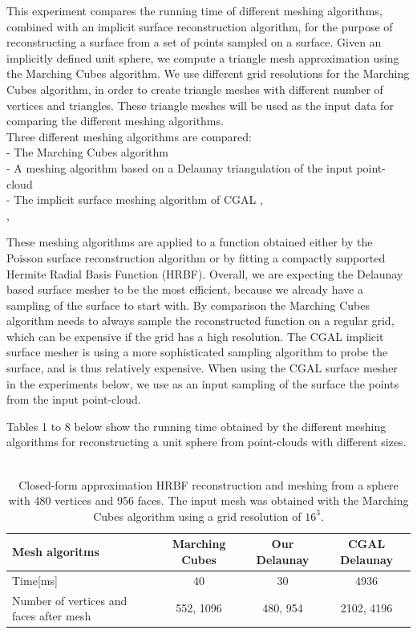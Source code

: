 \documentclass{article}
\begin{document}
This experiment compares the running time of different meshing algorithms, combined with an implicit surface reconstruction algorithm, for the purpose of reconstructing a surface from a set of points sampled on a surface.
Given an implicitly defined unit sphere, we compute a triangle mesh approximation using the Marching Cubes algorithm. We use different grid resolutions for the Marching Cubes algorithm, in order to create triangle meshes with different number of vertices and triangles. These triangle meshes will be used as the input data for comparing the different meshing algorithms.
\\
Three different meshing algorithms are compared:\\
- The Marching Cubes algorithm \cite{marching}\\
- A meshing algorithm based on a Delaunay triangulation of the input point-cloud \cite{ourDelaunay1}\\
- The implicit surface meshing algorithm of CGAL \cite{cgalDelaunay1}, \cite{cgalDelaunay2}\\, \cite{cgalDelaunay3}

These meshing algorithms are applied to a function obtained either by the Poisson surface reconstruction algorithm or by fitting a compactly supported Hermite Radial Basis Function (HRBF).
Overall, we are expecting the Delaunay based surface mesher to be the most efficient, because we already have a sampling of the surface to start with. By comparison the Marching Cubes algorithm needs to always sample the reconstructed function on a regular grid, which can be expensive if the grid has a high resolution.
The CGAL implicit surface mesher is using a more sophisticated sampling algorithm to probe the surface, and is thus relatively expensive. When using the CGAL surface mesher in the experiments below, we use as an input sampling of the surface the points from the input point-cloud.

Tables 1 to 8 below show the running time obtained by the different meshing algorithms for reconstructing a unit sphere from point-clouds with different sizes.\\
\\
\noindent
\begin{table}
 \caption{Closed-form approximation HRBF reconstruction and meshing from a sphere with 480 vertices and 956 faces. The input mesh was obtained with the Marching Cubes algorithm using a grid resolution of $16^3$.}
  \begin{tabular}{|l|c|c|c|} \hline
    Mesh algoritms & Marching Cubes & Our Delaunay & CGAL Delaunay \\  \hline
    Time[ms] & 40 & 30 & 4936\\ \hline
    Number of vertices and faces after mesh & 552, 1096 & 480, 954 &2102, 4196 \\ \hline
  \end{tabular}
\end{table}
\end{document}
